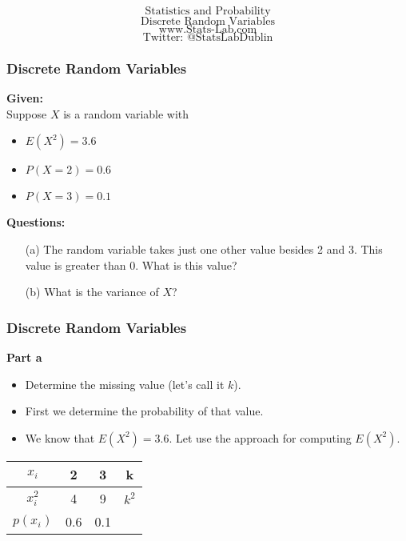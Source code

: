 \documentclass{beamer}
\begin{document}
\begin{frame}
\Huge
\[ \mbox{Statistics and Probability} \]
\LARGE
\[ \mbox{Discrete Random Variables} \]
\bigskip
\Large
\[ \mbox{www.Stats-Lab.com} \]
\[ \mbox{Twitter: @StatsLabDublin} \]
\bigskip

\end{frame}

\begin{frame}
\frametitle{Discrete Random Variables}
\Large
\vspace{-0.5cm}
\textbf{Given:}\\
Suppose $X$ is a random variable with 
\begin{itemize}
\item $E(X^2)=3.6$
\item $P(X=2)=0.6$
\item $P(X=3)=0.1$
\end{itemize}


\textbf{Questions:}
\begin{itemize}
\item[(a)] The random variable takes just one other value besides 2 and 3. This value is greater than 0. What is this value?\\
\item[(b)] What is the variance of $X$?
\end{itemize}
\end{frame}

\begin{frame}
\frametitle{Discrete Random Variables}
\Large
\textbf{Part a}
\begin{itemize}
\item Determine the missing value (let's call it $k$).\\
\item First we determine the probability of that value. 
\item We know that $E(X^2)=3.6$. Let use the approach for computing $E(X^2)$.

\end{itemize}

\begin{center}
\begin{tabular}{|c|c|c|c|}
\hline
$x_i$ & \phantom{sp}2\phantom{sp} & \phantom{sp}3\phantom{sp} & \phantom{sp}k\phantom{sp} \\ \hline
$x^2_i$ & 4 & 9 & $k^2$ \\ \hline
$p(x_i)$ & 0.6 &  0.1 &  \\ \hline 
\end{tabular}
\end{center}
\end{frame}
\end{document}
